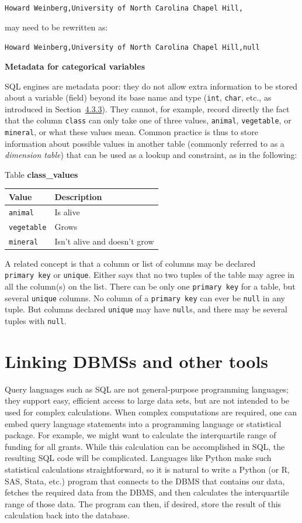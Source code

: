 \documentclass[]{krantz}
\begin{document}
\texttt{Howard\ Weinberg,University\ of\ North\ Carolina\ Chapel\ Hill,}

may need to be rewritten as:

\texttt{Howard\ Weinberg,University\ of\ North\ Carolina\ Chapel\ Hill,null}

\textbf{Metadata for categorical variables}

SQL engines are metadata poor: they do not allow extra information to be
stored about a variable (field) beyond its base name and type
(\texttt{int}, \texttt{char}, etc., as introduced in
Section~\protect\hyperlink{sec:db:schema}{4.3.3}). They cannot, for
example, record directly the fact that the column \texttt{class} can
only take one of three values, \texttt{animal}, \texttt{vegetable}, or
\texttt{mineral}, or what these values mean. Common practice is thus to
store information about possible values in another table (commonly
referred to as a \emph{dimension table}) that can be used as a lookup
and constraint, as in the following:

Table \textbf{class\_values}

\begin{longtable}[]{@{}ll@{}}
\toprule
\textbf{Value} & \textbf{Description}\tabularnewline
\midrule
\endhead
\texttt{animal} & Is alive\tabularnewline
\texttt{vegetable} & Grows\tabularnewline
\texttt{mineral} & Isn't alive and doesn't grow\tabularnewline
\bottomrule
\end{longtable}

A related concept is that a column or list of columns may be declared
\texttt{primary\ key} or \texttt{unique}. Either says that no two tuples
of the table may agree in all the column(s) on the list. There can be
only one \texttt{primary\ key} for a table, but several \texttt{unique}
columns. No column of a \texttt{primary\ key} can ever be \texttt{null}
in any tuple. But columns declared \texttt{unique} may have
\texttt{null}s, and there may be several tuples with \texttt{null}.

\section{Linking DBMSs and other
tools}\label{linking-dbmss-and-other-tools}

Query languages such as SQL are not general-purpose programming
languages; they support easy, efficient access to large data sets, but
are not intended to be used for complex calculations. When complex
computations are required, one can embed query language statements into
a programming language or statistical package. For example, we might
want to calculate the interquartile range of funding for all grants.
While this calculation can be accomplished in SQL, the resulting SQL
code will be complicated. Languages like Python make such statistical
calculations straightforward, so it is natural to write a Python (or R,
SAS, Stata, etc.) program that connects to the DBMS that contains our
data, fetches the required data from the DBMS, and then calculates the
interquartile range of those data. The program can then, if desired,
store the result of this calculation back into the database.
\end{document}
